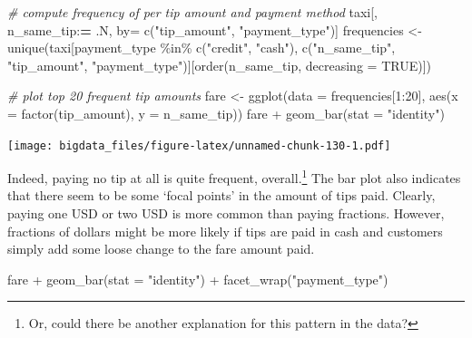 \documentclass[
  12pt,
]{style/krantz}
\newenvironment{Shaded}{\begin{snugshade}}{\end{snugshade}}
\newcommand{\AttributeTok}[1]{\textcolor[rgb]{0.77,0.63,0.00}{#1}}
\newcommand{\CommentTok}[1]{\textcolor[rgb]{0.56,0.35,0.01}{\textit{#1}}}
\newcommand{\ConstantTok}[1]{\textcolor[rgb]{0.00,0.00,0.00}{#1}}
\newcommand{\DecValTok}[1]{\textcolor[rgb]{0.00,0.00,0.81}{#1}}
\newcommand{\ErrorTok}[1]{\textcolor[rgb]{0.64,0.00,0.00}{\textbf{#1}}}
\newcommand{\FunctionTok}[1]{\textcolor[rgb]{0.00,0.00,0.00}{#1}}
\newcommand{\NormalTok}[1]{#1}
\newcommand{\OtherTok}[1]{\textcolor[rgb]{0.56,0.35,0.01}{#1}}
\newcommand{\SpecialCharTok}[1]{\textcolor[rgb]{0.00,0.00,0.00}{#1}}
\newcommand{\StringTok}[1]{\textcolor[rgb]{0.31,0.60,0.02}{#1}}
\begin{document}
\begin{Shaded}
\begin{Highlighting}[]
\CommentTok{\# compute frequency of per tip amount and payment method}
\NormalTok{taxi[, n\_same\_tip}\SpecialCharTok{:}\ErrorTok{=}\NormalTok{ .N, by}\OtherTok{=} \FunctionTok{c}\NormalTok{(}\StringTok{"tip\_amount"}\NormalTok{, }\StringTok{"payment\_type"}\NormalTok{)]}
\NormalTok{frequencies }\OtherTok{\textless{}{-}} \FunctionTok{unique}\NormalTok{(taxi[payment\_type }\SpecialCharTok{\%in\%} \FunctionTok{c}\NormalTok{(}\StringTok{"credit"}\NormalTok{, }\StringTok{"cash"}\NormalTok{),}
                           \FunctionTok{c}\NormalTok{(}\StringTok{"n\_same\_tip"}\NormalTok{, }\StringTok{"tip\_amount"}\NormalTok{, }\StringTok{"payment\_type"}\NormalTok{)][}\FunctionTok{order}\NormalTok{(n\_same\_tip, }\AttributeTok{decreasing =} \ConstantTok{TRUE}\NormalTok{)])}


\CommentTok{\# plot top 20 frequent tip amounts}
\NormalTok{fare }\OtherTok{\textless{}{-}} \FunctionTok{ggplot}\NormalTok{(}\AttributeTok{data =}\NormalTok{ frequencies[}\DecValTok{1}\SpecialCharTok{:}\DecValTok{20}\NormalTok{], }\FunctionTok{aes}\NormalTok{(}\AttributeTok{x =} \FunctionTok{factor}\NormalTok{(tip\_amount), }\AttributeTok{y =}\NormalTok{ n\_same\_tip)) }
\NormalTok{fare }\SpecialCharTok{+} \FunctionTok{geom\_bar}\NormalTok{(}\AttributeTok{stat =} \StringTok{"identity"}\NormalTok{) }
\end{Highlighting}
\end{Shaded}

\texttt{[image: bigdata\_files/figure-latex/unnamed-chunk-130-1.pdf]}

Indeed, paying no tip at all is quite frequent, overall.\footnote{Or, could there be another explanation for this pattern in the data?} The bar plot also indicates that there seem to be some `focal points' in the amount of tips paid. Clearly, paying one USD or two USD is more common than paying fractions. However, fractions of dollars might be more likely if tips are paid in cash and customers simply add some loose change to the fare amount paid.

\begin{Shaded}
\begin{Highlighting}[]
\NormalTok{fare }\SpecialCharTok{+} \FunctionTok{geom\_bar}\NormalTok{(}\AttributeTok{stat =} \StringTok{"identity"}\NormalTok{) }\SpecialCharTok{+} 
     \FunctionTok{facet\_wrap}\NormalTok{(}\StringTok{"payment\_type"}\NormalTok{) }
\end{Highlighting}
\end{Shaded}
\end{document}
